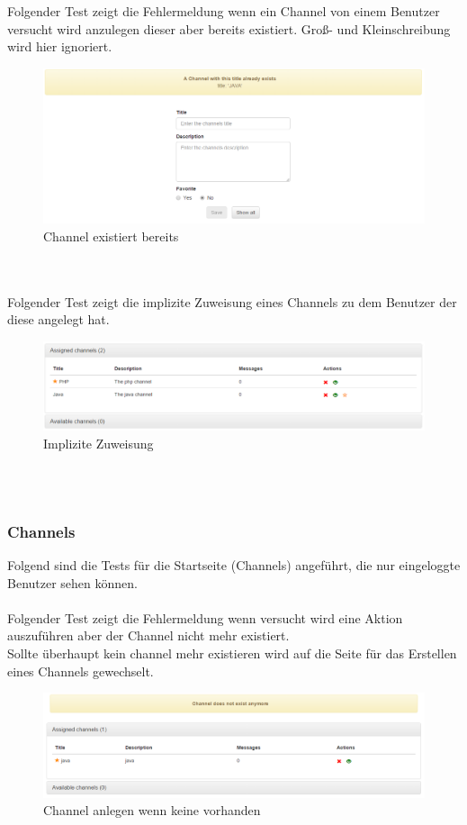 \documentclass[11pt, a4paper, twoside]{article}   	%
\begin{document}
Folgender Test zeigt die Fehlermeldung wenn ein Channel von einem Benutzer versucht wird anzulegen dieser aber bereits existiert. Groß- und Kleinschreibung wird hier ignoriert.
\begin{figure}[h]
	\centering
	\includegraphics[scale=0.5]{images/start_new_channel_fail.PNG}
	\caption
	{Channel existiert bereits}
\end{figure}\\\\

Folgender Test zeigt die implizite Zuweisung eines Channels zu dem Benutzer der diese angelegt hat.
\begin{figure}[h]
	\centering
	\includegraphics[scale=0.5]{images/start_channels_assigned_after_creation.PNG}
	\caption
	{Implizite Zuweisung}
\end{figure}\\\\
\newpage

\subsubsection{Channels}
Folgend sind die Tests für die Startseite (Channels) angeführt, die nur eingeloggte Benutzer sehen können.\\\\
Folgender Test zeigt die Fehlermeldung wenn versucht wird eine Aktion auszuführen aber der Channel nicht mehr existiert.\\
Sollte überhaupt kein channel mehr existieren wird auf die Seite für das Erstellen eines Channels gewechselt.
\begin{figure}[h]
	\centering
	\includegraphics[scale=0.5]{images/start_channels_action_fail.PNG}
	\caption
	{Channel anlegen wenn keine vorhanden}
\end{figure}\\\\
\end{document}
